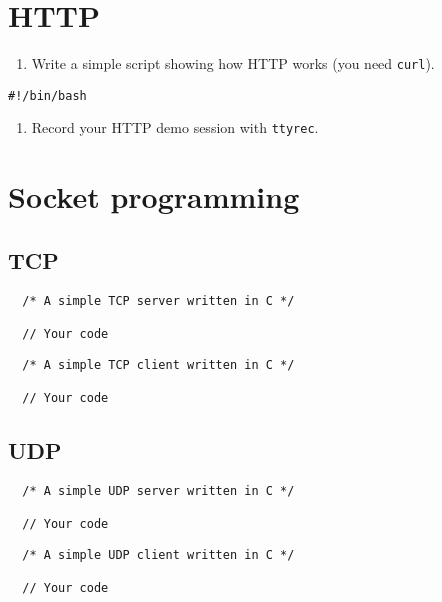 \documentclass{swfulabreport}
\begin{document}
\section{HTTP}\label{http}

\begin{enumerate}
\def\labelenumi{\arabic{enumi}.}
\tightlist
\item
  Write a simple script showing how HTTP works (you need
  \texttt{curl}).
\end{enumerate}

\begin{verbatim}
#!/bin/bash
\end{verbatim}

\begin{enumerate}
\def\labelenumi{\arabic{enumi}.}
\setcounter{enumi}{1}
\tightlist
\item
  Record your HTTP demo session with \texttt{ttyrec}.
\end{enumerate}

\section{Socket programming}\label{socket-programming}

\subsection{TCP}\label{tcp}

\begin{verbatim}
  /* A simple TCP server written in C */

  // Your code
\end{verbatim}

\begin{verbatim}
  /* A simple TCP client written in C */

  // Your code
\end{verbatim}

\subsection{UDP}\label{udp}

\begin{verbatim}
  /* A simple UDP server written in C */

  // Your code
\end{verbatim}

\begin{verbatim}
  /* A simple UDP client written in C */

  // Your code
\end{verbatim}
\end{document}
